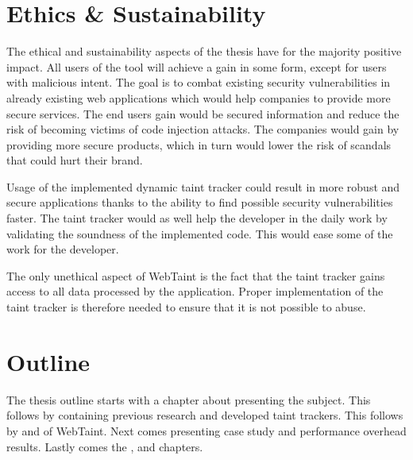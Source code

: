 \section{Ethics \& Sustainability}
\label{Ethics}
The ethical and sustainability aspects of the thesis have for the majority positive impact. All users of the tool will achieve a gain in some form, except for users with malicious intent. The goal is to combat existing security vulnerabilities in already existing web applications which would help companies to provide more secure services. The end users gain would be secured information and reduce the risk of becoming victims of code injection attacks. The companies would gain by providing more secure products, which in turn would lower the risk of scandals that could hurt their brand. 

Usage of the implemented dynamic taint tracker could result in more robust and secure applications thanks to the ability to find possible security vulnerabilities faster. The taint tracker would as well help the developer in the daily work by validating the soundness of the implemented code. This would ease some of the work for the developer.

The only unethical aspect of WebTaint is the fact that the taint tracker gains access to all data processed by the application. Proper implementation of the taint tracker is therefore needed to ensure that it is not possible to abuse.



\section{Outline}
\label{Outline}
The thesis outline starts with a chapter about \textit{} presenting the subject. This follows by \textit{} containing previous research and developed taint trackers. This follows by \textit{} and \textit{} of WebTaint. Next comes \textit{} presenting case study and performance overhead results. Lastly comes the \textit{}, \textit{} and \textit{} chapters.